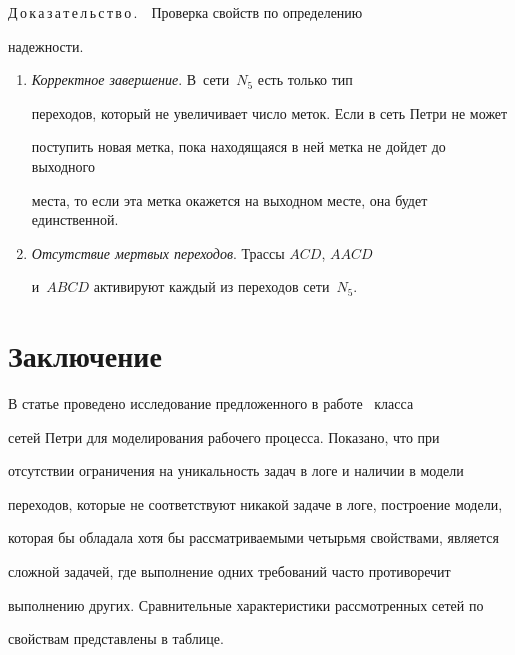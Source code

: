   

  \smallskip

  

  \noindent

  Д\,о\,к\,а\,з\,а\,т\,е\,л\,ь\,с\,т\,в\,о\,.\ \ Проверка свойств по определению 

надежности.

  \begin{enumerate}[1.]

\item \textit{Корректное завершение}. В~сети~$N_5$ есть только тип 

переходов, который не увеличивает число меток. Если в сеть Петри не может 

поступить новая метка, пока находящаяся в ней метка не дойдет до выходного 

места, то если эта метка окажется на выходном месте, она будет единственной.

\item \textit{Отсутствие мертвых переходов}. Трассы $ACD$, $AACD$ 

и~$ABCD$ активируют каждый из переходов сети~$N_5$.

\end{enumerate}

  

  \section{Заключение}

   

  В статье проведено исследование предложенного в работе~\cite{5-tg} класса 

сетей Петри для моделирования рабочего процесса. Показано, что при 

отсутствии ограничения на уникальность задач в логе и наличии в модели 

переходов, которые не соответствуют никакой задаче в логе, построение модели, 

которая бы обладала хотя бы рассматриваемыми четырьмя свойствами, является 

сложной задачей, где выполнение одних требований часто противоречит 

выполнению других. Сравнительные характеристики рассмотренных сетей по 

свойствам представлены в таблице.

   

  

